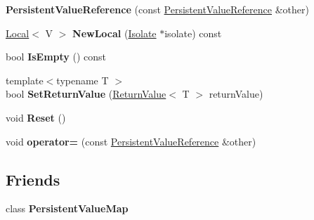 \begin{DoxyCompactItemize}
\item 
\hypertarget{classv8_1_1PersistentValueMap_1_1PersistentValueReference_a1a4638469ba0a5901036d69a1483f7c6}{{\bfseries Persistent\-Value\-Reference} (const \hyperlink{classv8_1_1PersistentValueMap_1_1PersistentValueReference}{Persistent\-Value\-Reference} \&other)}\label{classv8_1_1PersistentValueMap_1_1PersistentValueReference_a1a4638469ba0a5901036d69a1483f7c6}

\item 
\hypertarget{classv8_1_1PersistentValueMap_1_1PersistentValueReference_a21dfb12fb2c0e572ac796ac1d7d8d01d}{\hyperlink{classv8_1_1Local}{Local}$<$ V $>$ {\bfseries New\-Local} (\hyperlink{classv8_1_1Isolate}{Isolate} $\ast$isolate) const }\label{classv8_1_1PersistentValueMap_1_1PersistentValueReference_a21dfb12fb2c0e572ac796ac1d7d8d01d}

\item 
\hypertarget{classv8_1_1PersistentValueMap_1_1PersistentValueReference_a5d0180c813aad9ab87e2342c051c197e}{bool {\bfseries Is\-Empty} () const }\label{classv8_1_1PersistentValueMap_1_1PersistentValueReference_a5d0180c813aad9ab87e2342c051c197e}

\item 
\hypertarget{classv8_1_1PersistentValueMap_1_1PersistentValueReference_a19b4ed2902914b03f1fbb8310642e748}{{\footnotesize template$<$typename T $>$ }\\bool {\bfseries Set\-Return\-Value} (\hyperlink{classv8_1_1ReturnValue}{Return\-Value}$<$ T $>$ return\-Value)}\label{classv8_1_1PersistentValueMap_1_1PersistentValueReference_a19b4ed2902914b03f1fbb8310642e748}

\item 
\hypertarget{classv8_1_1PersistentValueMap_1_1PersistentValueReference_a898bc6699311170a785884477ce109a1}{void {\bfseries Reset} ()}\label{classv8_1_1PersistentValueMap_1_1PersistentValueReference_a898bc6699311170a785884477ce109a1}

\item 
\hypertarget{classv8_1_1PersistentValueMap_1_1PersistentValueReference_a4e38453a562f60e43fa553d3666c5ec3}{void {\bfseries operator=} (const \hyperlink{classv8_1_1PersistentValueMap_1_1PersistentValueReference}{Persistent\-Value\-Reference} \&other)}\label{classv8_1_1PersistentValueMap_1_1PersistentValueReference_a4e38453a562f60e43fa553d3666c5ec3}

\end{DoxyCompactItemize}
\subsection*{Friends}
\begin{DoxyCompactItemize}
\item 
\hypertarget{classv8_1_1PersistentValueMap_1_1PersistentValueReference_aa96af8a34f1f35df272c683a483162da}{class {\bfseries Persistent\-Value\-Map}}\label{classv8_1_1PersistentValueMap_1_1PersistentValueReference_aa96af8a34f1f35df272c683a483162da}

\end{DoxyCompactItemize}


